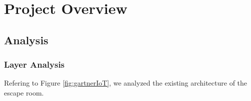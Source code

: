 \chapter{Project Overview} %
\label{Chapter3} %
\section{Analysis}

\subsection{Layer Analysis}
Refering to Figure \ref{fig:gartnerIoT}, we analyzed the existing architecture of the escape room.

